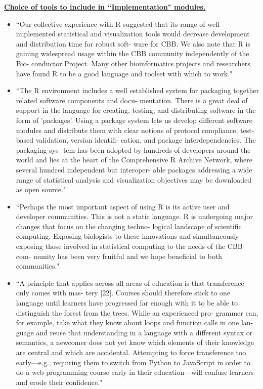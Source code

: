 \documentclass[pdftex,english,11pt,parskip=half]{scrartcl}
\begin{document}
\underline{\textbf{Choice of tools to include in ``Implementation" modules.}}

\begin{itemize}
\item ``Our collective experience with R suggested that its range of well-implemented statistical and visualization tools would decrease development and distribution time for robust soft- ware for CBB. We also note that R is gaining widespread usage within the CBB community independently of the Bio- conductor Project. Many other bioinformatics projects and researchers have found R to be a good language and toolset with which to work." \cite{gentleman2004bioconductor}
\item ``The R environment includes a well established system for packaging together related software components and docu- mentation. There is a great deal of support in the language for creating, testing, and distributing software in the form of 'packages'. Using a package system lets us develop different software modules and distribute them with clear notions of protocol compliance, test-based validation, version identifi- cation, and package interdependencies. The packaging sys- tem has been adopted by hundreds of developers around the world and lies at the heart of the Comprehensive R Archive Network, where several hundred independent but interoper- able packages addressing a wide range of statistical analysis and visualization objectives may be downloaded as open source." \cite{gentleman2004bioconductor}
\item ``Perhaps the most important aspect of using R is its active user and developer communities. This is not a static language. R is undergoing major changes that focus on the changing techno- logical landscape of scientific computing. Exposing biologists to these innovations and simultaneously exposing those involved in statistical computing to the needs of the CBB com- munity has been very fruitful and we hope beneficial to both communities." \cite{gentleman2004bioconductor}
\item ``A principle that applies across all areas of education is that transference only comes with mas- tery [22]. Courses should therefore stick to one language until learners have progressed far enough with it to be able to distinguish the forest from the trees. While an experienced pro- grammer can, for example, take what they know about loops and function calls in one lan- guage and reuse that understanding in a language with a different syntax or semantics, a newcomer does not yet know which elements of their knowledge are central and which are accidental. Attempting to force transference too early—e.g., requiring them to switch from Python to JavaScript in order to do a web programming course early in their education—will confuse learners and erode their confidence." \cite{brown2018ten}
\end{itemize}
\end{document}
